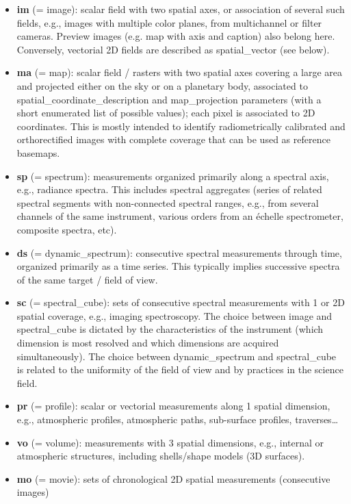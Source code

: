 \documentclass[11pt,a4paper]{ivoa}
\begin{document}
\begin{itemize}
\item \textbf{im }(= image): scalar field with two spatial axes, or association of several such fields, e.g., images with multiple color planes, from multichannel or filter cameras. Preview images (e.g. map with axis and caption) also belong here. Conversely, vectorial 2D fields are described as spatial\_vector (see below).
\item \textbf{ma }(= map): scalar field / rasters with two spatial axes covering a large area and projected either on the sky or on a planetary body, associated to spatial\_coordinate\_description and map\_projection parameters (with a short enumerated list of possible values); each pixel is associated to 2D coordinates. This is mostly intended to identify radiometrically calibrated and orthorectified images with complete coverage that can be used as reference basemaps. 
\item \textbf{sp }(= spectrum): measurements organized primarily along a spectral axis, e.g., radiance spectra. This includes spectral aggregates (series of related spectral segments with non-connected spectral ranges, e.g., from several channels of the same instrument, various orders from an échelle spectrometer, composite spectra, etc).
\item \textbf{ds }(= dynamic\_spectrum): consecutive spectral measurements through time, organized primarily as a time series. This typically implies successive spectra of the same target / field of view.
\item \textbf{sc }(= spectral\_cube): sets of consecutive spectral measurements with 1 or 2D spatial coverage, e.g., imaging spectroscopy. The choice between image and spectral\_cube is dictated by the characteristics of the instrument (which dimension is most resolved and which dimensions are acquired simultaneously). The choice between dynamic\_spectrum and spectral\_cube is related to the uniformity of the field of view and by practices in the science field.
\item \textbf{pr }(= profile): scalar or vectorial measurements along 1 spatial dimension, e.g., atmospheric profiles, atmospheric paths, sub-surface profiles, traverses…
\item \textbf{vo }(= volume): measurements with 3 spatial dimensions, e.g., internal or atmospheric structures, including shells/shape models (3D surfaces).
\item \textbf{mo }(= movie): sets of chronological 2D spatial measurements (consecutive images)

\end{itemize}
\end{document}
